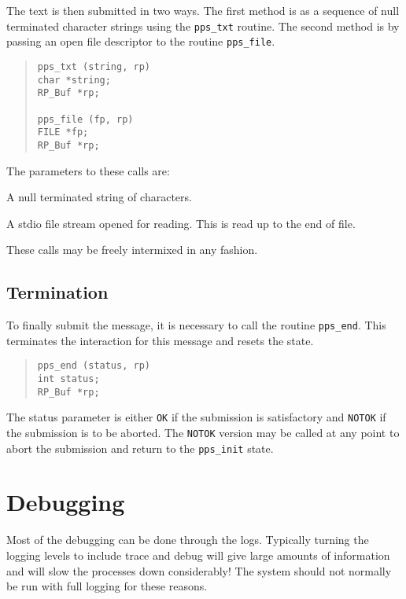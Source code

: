 The text is then submitted in two ways. The first method is as a
sequence of null terminated character strings using the \verb|pps_txt|
routine. The second method is by passing an open file descriptor to
the routine \verb|pps_file|.
\begin{quote}\begin{verbatim}
pps_txt (string, rp)
char *string;
RP_Buf *rp;

pps_file (fp, rp)
FILE *fp;
RP_Buf *rp;
\end{verbatim}\end{quote}
The parameters to these calls are:
\begin{describe}
\item[\verb|string|:]	A null terminated string of characters.

\item[\verb|file|:] A stdio file stream opened for reading. This is
read up to the end of file.
\end{describe}
These calls may be freely intermixed in any fashion.

\subsection{Termination}

To finally submit the message, it is necessary to call the routine
\verb|pps_end|. This terminates the interaction for this message and
resets the state. 
\begin{quote}\begin{verbatim}
pps_end (status, rp)
int status;
RP_Buf *rp;
\end{verbatim}\end{quote}
The status parameter is either \verb|OK| if the submission 
is satisfactory and \verb|NOTOK| if the submission is to be
aborted. The \verb|NOTOK| version may be called at any point to
abort the submission and return to the \verb|pps_init| state.

\section {Debugging}

Most of the debugging can be done through the logs. Typically turning
the logging levels to include trace and debug will give large amounts
of information and will slow the processes down considerably! The
system should not normally be run with full logging for these reasons.

